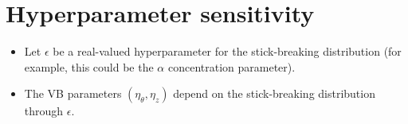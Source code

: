 \documentclass[a0,plainsections,30pt]{sciposter}\usepackage[]{graphicx}\usepackage[]{color}
\newcommand{\Expect}{\mathbb{E}}
\newcommand{\etazopt}{\eta_z^{*}}
\newcommand{\etathetaopt}{\eta_\theta^{*}}
\begin{document}
\begin{minipage}[t]{0.45\textwidth}

% 
% 
% 

\vspace{-0.6in}
\section*{Hyperparameter sensitivity}
\vspace{-0.3in}

\begin{itemize}

\item Let $\epsilon$ be a real-valued hyperparameter for the stick-breaking distribution
(for example, this could be the $\alpha$ concentration parameter). 

\item The VB parameters $(\eta_\theta, \eta_z)$ depend on the stick-breaking distribution through $\epsilon$. 


\end{itemize}
\end{minipage}
\end{document}
